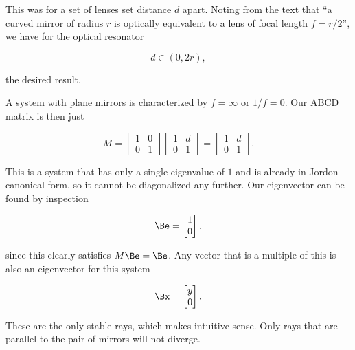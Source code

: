 {This was for a set of lenses set distance $d$ apart.  Noting from the text that ``a curved mirror of radius $r$ is optically equivalent to a lens of focal length $f = r/2$'', we have for the optical resonator

\begin{dmath}\label{eqn:problemSet4Problem4:620}
\boxed{
d \in (0, 2 r),
}
\end{dmath}

the desired result.


A system with plane mirrors is characterized by $f = \infty$ or $1/f = 0$.  Our ABCD matrix is then just

\begin{equation}\label{eqn:problemSet4Problem4:20}
M = 
\begin{bmatrix}
1 & 0 \\
0 & 1
\end{bmatrix}
\begin{bmatrix}
1 & d \\
0 & 1
\end{bmatrix}
=
\begin{bmatrix}
1 & d \\
0 & 1
\end{bmatrix}.
\end{equation}

This is a system that has only a single eigenvalue of $1$ and is already in Jordon canonical form, so it cannot be diagonalized any further.  Our eigenvector can be found by inspection

\begin{dmath}\label{eqn:problemSet4Problem4:640}
\Be = 
\begin{bmatrix}
1 \\
0 
\end{bmatrix},
\end{dmath}

since this clearly satisfies $M \Be = \Be$.  Any vector that is a multiple of this is also an eigenvector for this system

\begin{dmath}\label{eqn:problemSet4Problem4:660}
\Bx = 
\begin{bmatrix}
y \\ 
0
\end{bmatrix}.
\end{dmath}

These are the only stable rays, which makes intuitive sense.  Only rays that are parallel to the pair of mirrors will not diverge.

}
